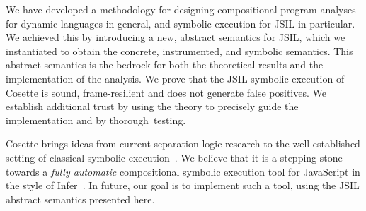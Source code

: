 \documentclass[sigconf, review]{acmart}
\newcommand{\jsil}{JSIL\xspace}
\newcommand{\cosette}{Cosette\xspace}
\newcommand{\myparagraph}[1]{\smallskip\noindent {\bf #1.}\hspace{1pt}}
\begin{document}
We have developed a methodology for designing compositional program
analyses for dynamic languages in general, and symbolic execution for
JSIL in particular. We achieved this by introducing a new, abstract
semantics for JSIL, which we instantiated to obtain the concrete,
instrumented, and symbolic semantics. 
This abstract semantics is the bedrock for both the theoretical results 
and the implementation of the analysis. We prove that the \jsil symbolic 
execution of Cosette is
sound, frame-resilient and does not generate false positives. We
establish additional trust by using the theory to precisely guide the
implementation and by thorough~testing.

\cosette brings ideas from current separation logic research to the well-established 
setting of classical symbolic execution~\cite{andreasen:acmsurv:2017}. We believe that 
it is a stepping stone towards a {\em fully automatic} compositional symbolic execution 
tool for JavaScript in the style of Infer~\cite{calcagno:nasa:2011}. In future, 
our goal is to implement such a tool, using the \jsil abstract semantics presented here.





%
\end{document}
